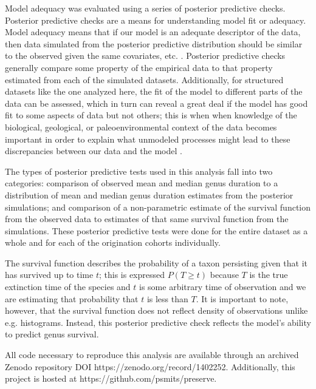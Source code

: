 \documentclass[11pt]{article}
\begin{document}
Model adequacy was evaluated using a series of posterior predictive checks. Posterior predictive checks are a means for understanding model fit or adequacy. Model adequacy means that if our model is an adequate descriptor of the data, then data simulated from the posterior predictive distribution should be similar to the observed given the same covariates, etc. \citep{Gelman2013d}. Posterior predictive checks generally compare some property of the empirical data to that property estimated from each of the simulated datasets. Additionally, for structured datasets like the one analyzed here, the fit of the model to different parts of the data can be assessed, which in turn can reveal a great deal if the model has good fit to some aspects of data but not others; this is when when knowledge of the biological, geological, or paleoenvironmental context of the data becomes important in order to explain what unmodeled processes might lead to these discrepancies between our data and the model \citep{Gelman2013d}.

The types of posterior predictive tests used in this analysis fall into two categories: comparison of observed mean and median genus duration to a distribution of mean and median genus duration estimates from the posterior simulations; and comparison of a non-parametric estimate of the survival function from the observed data to estimates of that same survival function from the simulations. These posterior predictive tests were done for the entire dataset as a whole and for each of the origination cohorts individually.

The survival function describes the probability of a taxon persisting given that it has survived up to time \(t\); this is expressed \(P(T \geq t)\) because \(T\) is the true extinction time of the species and \(t\) is some arbitrary time of observation and we are estimating that probability that \(t\) is less than \(T\). It is important to note, however, that the survival function does not reflect density of observations unlike e.g. histograms. Instead, this posterior predictive check reflects the model's ability to predict genus survival.


All code necessary to reproduce this analysis are available through an archived Zenodo repository DOI https://zenodo.org/record/1402252. Additionally, this project is hosted at https://github.com/psmits/preserve.
\end{document}
